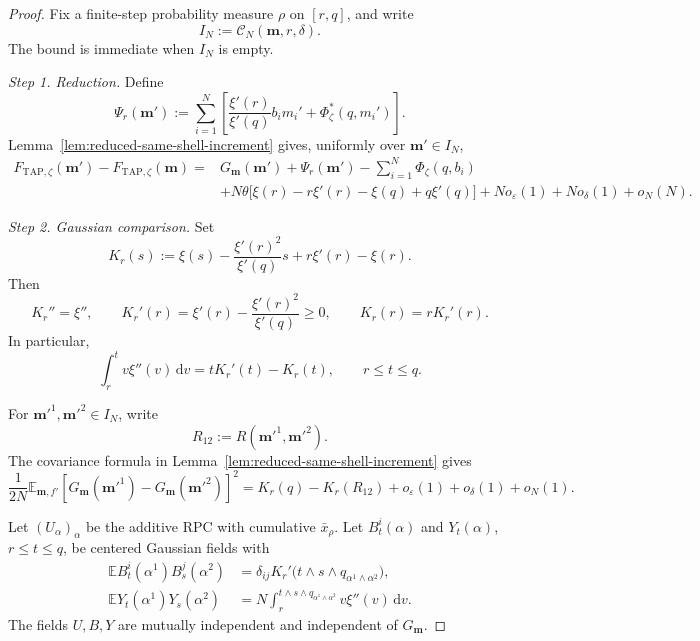 \documentclass[a4paper,10pt,reqno]{amsart}
\numberwithin{equation}{section}
\newcommand{\ve}{\varepsilon}
\newcommand{\dE}{\mathbb{E}}%
\newcommand{\mc}{\mathcal}
\newcommand{\dd}{\mathrm{d}}
\newcommand{\TAP}{\mathrm{TAP}}
\newcommand{\bfm}{\mathbf{m}}
\begin{document}
	\begin{proof}
		Fix a finite-step probability measure \(\rho\) on \([r,q]\), and write
		\[
		I_N:=\mc C_N(\bfm,r,\delta).
		\]
		The bound is immediate when \(I_N\) is empty.
		
		\medskip\noindent\emph{Step 1. Reduction.}
		Define
		\[
		\Psi_r(\bfm')
		:=
		\sum_{i=1}^N
		\left[
		\frac{\xi'(r)}{\xi'(q)}b_im_i'
		+\Phi_\zeta^*(q,m_i')
		\right].
		\]
		Lemma~\ref{lem:reduced-same-shell-increment} gives, uniformly over
		\(\bfm'\in I_N\),
		\[
		\begin{aligned}
			F_{\TAP,\zeta}(\bfm')-F_{\TAP,\zeta}(\bfm)
			={}&
			G_\bfm(\bfm')+\Psi_r(\bfm')
			-\sum_{i=1}^N\Phi_\zeta(q,b_i)\\
			&+
			N\theta
			\bigl[
			\xi(r)-r\xi'(r)-\xi(q)+q\xi'(q)
			\bigr]
			+N o_\ve(1)+N o_\delta(1)+o_N(N).
		\end{aligned}
		\]
		
		\medskip\noindent\emph{Step 2. Gaussian comparison.}
		Set
		\[
		K_r(s)
		:=
		\xi(s)-\frac{\xi'(r)^2}{\xi'(q)}s+r\xi'(r)-\xi(r).
		\]
		Then
		\[
		K_r''=\xi'',
		\qquad
		K_r'(r)
		=
		\xi'(r)-\frac{\xi'(r)^2}{\xi'(q)}
		\ge0,
		\qquad
		K_r(r)=rK_r'(r).
		\]
		In particular,
		\[
		\int_r^t v\xi''(v)\,\dd v
		=
		tK_r'(t)-K_r(t),
		\qquad r\le t\le q.
		\]
		
		For \(\bfm'^1,\bfm'^2\in I_N\), write
		\[
		R_{12}:=R(\bfm'^1,\bfm'^2).
		\]
		The covariance formula in
		Lemma~\ref{lem:reduced-same-shell-increment} gives
		\[
		\frac1{2N}\dE_{\bfm,f'}
		\left[
		G_\bfm(\bfm'^1)
		-G_\bfm(\bfm'^2)
		\right]^2
		=
		K_r(q)-K_r(R_{12})
		+o_\ve(1)+o_\delta(1)+o_N(1).
		\]
		
		Let \((U_\alpha)_\alpha\) be the additive RPC with cumulative
		\(\bar x_\rho\). Let \(B_t^i(\alpha)\) and \(Y_t(\alpha)\),
		\(r\le t\le q\), be centered Gaussian fields with
		\[
		\begin{aligned}
			\dE B_t^i(\alpha^1)B_s^j(\alpha^2)
			&=
			\delta_{ij}
			K_r'\bigl(
			t\wedge s\wedge q_{\alpha^1\wedge\alpha^2}
			\bigr),\\
			\dE Y_t(\alpha^1)Y_s(\alpha^2)
			&=
			N\int_r^{t\wedge s\wedge q_{\alpha^1\wedge\alpha^2}}
			v\xi''(v)\,\dd v.
		\end{aligned}
		\]
		The fields \(U,B,Y\) are mutually independent and independent of
		\(G_\bfm\).
		

\end{proof}
\end{document}
